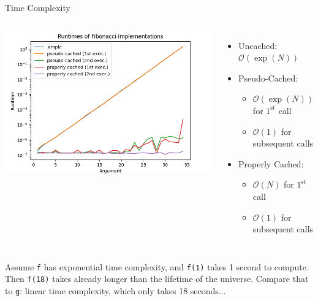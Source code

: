
\begin{frame}{Time Complexity}
%
\vspace{-3pt}
\begin{columns}
\includegraphics[width=\linewidth]{./gfx/02-cached-fib}
%
\begin{itemize}
\item Uncached: $\mathcal{O}(\exp(N))$
\item Pseudo-Cached: 
	\begin{itemize}
	\item $\mathcal{O}(\exp(N))$ for $1^{\text{st}}$ call
	\item $\mathcal{O}(1)$ for subsequent calls
	\end{itemize}
\item Properly Cached: 
	\begin{itemize}
	\item $\mathcal{O}(N)$ for $1^{\text{st}}$ call
	\item $\mathcal{O}(1)$ for subsequent calls
	\end{itemize}
\end{itemize}
\end{columns}
%
\begin{hintbox}
\footnotesize
Assume \texttt{f} has exponential time complexity, and \texttt{f(1)} takes 1 second to compute. Then \texttt{f(18)} takes already longer than the lifetime of the universe.
Compare that to \texttt{g}: linear time complexity, which only takes 18 seconds...
\end{hintbox}
%
\end{frame}

